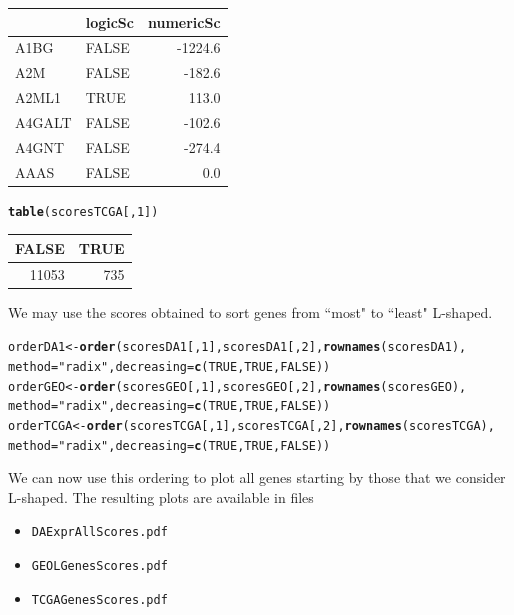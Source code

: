 \documentclass[a4paper,10pt]{article}\usepackage[]{graphicx}\usepackage[]{color}
\makeatletter
\newcommand{\hlnum}[1]{\textcolor[rgb]{0.686,0.059,0.569}{#1}}%
\newcommand{\hlstr}[1]{\textcolor[rgb]{0.192,0.494,0.8}{#1}}%
\newcommand{\hlstd}[1]{\textcolor[rgb]{0.345,0.345,0.345}{#1}}%
\newcommand{\hlkwb}[1]{\textcolor[rgb]{0.69,0.353,0.396}{#1}}%
\newcommand{\hlkwc}[1]{\textcolor[rgb]{0.333,0.667,0.333}{#1}}%
\newcommand{\hlkwd}[1]{\textcolor[rgb]{0.737,0.353,0.396}{\textbf{#1}}}%
\newenvironment{kframe}{%
 \def\at@end@of@kframe{}%
 \ifinner\ifhmode%
  \def\at@end@of@kframe{\end{minipage}}%
  \begin{minipage}{\columnwidth}%
 \fi\fi%
 \def\FrameCommand##1{\hskip\@totalleftmargin \hskip-\fboxsep
 \colorbox{shadecolor}{##1}\hskip-\fboxsep
     \hskip-\linewidth \hskip-\@totalleftmargin \hskip\columnwidth}%
 \MakeFramed {\advance\hsize-\width
   \@totalleftmargin\z@ \linewidth\hsize
   \@setminipage}}%
 {\par\unskip\endMakeFramed%
 \at@end@of@kframe}
\newenvironment{knitrout}{}{} %
\makeatother
\begin{document}
\begin{knitrout}
\begin{tabular}{l|l|r}
\hline
  & logicSc & numericSc\\
\hline
A1BG & FALSE & -1224.6\\
\hline
A2M & FALSE & -182.6\\
\hline
A2ML1 & TRUE & 113.0\\
\hline
A4GALT & FALSE & -102.6\\
\hline
A4GNT & FALSE & -274.4\\
\hline
AAAS & FALSE & 0.0\\
\hline
\end{tabular}\begin{kframe}\begin{alltt}
\hlkwd{table}\hlstd{(scoresTCGA[,}\hlnum{1}\hlstd{])}
\end{alltt}
\end{kframe}


\begin{tabular}{r|r}
\hline
FALSE & TRUE\\
\hline
11053 & 735\\
\hline
\end{tabular}
\end{knitrout}

We may use the scores obtained to sort genes from ``most" to ``least" L-shaped.

\begin{knitrout}
\color{fgcolor}\begin{kframe}
\begin{alltt}
\hlstd{orderDA1}\hlkwb{<-} \hlkwd{order}\hlstd{(scoresDA1[,}\hlnum{1}\hlstd{], scoresDA1[,}\hlnum{2}\hlstd{],} \hlkwd{rownames}\hlstd{(scoresDA1),}
                 \hlkwc{method}\hlstd{=}\hlstr{"radix"}\hlstd{,} \hlkwc{decreasing}\hlstd{=}\hlkwd{c}\hlstd{(}\hlnum{TRUE}\hlstd{,} \hlnum{TRUE}\hlstd{,} \hlnum{FALSE}\hlstd{))}
\hlstd{orderGEO}\hlkwb{<-} \hlkwd{order}\hlstd{(scoresGEO[,}\hlnum{1}\hlstd{], scoresGEO[,}\hlnum{2}\hlstd{],} \hlkwd{rownames}\hlstd{(scoresGEO),}
                 \hlkwc{method}\hlstd{=}\hlstr{"radix"}\hlstd{,} \hlkwc{decreasing}\hlstd{=}\hlkwd{c}\hlstd{(}\hlnum{TRUE}\hlstd{,} \hlnum{TRUE}\hlstd{,} \hlnum{FALSE}\hlstd{))}
\hlstd{orderTCGA}\hlkwb{<-} \hlkwd{order}\hlstd{(scoresTCGA[,}\hlnum{1}\hlstd{], scoresTCGA[,}\hlnum{2}\hlstd{],} \hlkwd{rownames}\hlstd{(scoresTCGA),}
                 \hlkwc{method}\hlstd{=}\hlstr{"radix"}\hlstd{,} \hlkwc{decreasing}\hlstd{=}\hlkwd{c}\hlstd{(}\hlnum{TRUE}\hlstd{,} \hlnum{TRUE}\hlstd{,} \hlnum{FALSE}\hlstd{))}
\end{alltt}
\end{kframe}
\end{knitrout}
We can now use this ordering to plot all genes starting by those that we consider L-shaped. The resulting plots are available in files 
\begin{itemize}
  \item \texttt{DAExprAllScores.pdf}
  \item \texttt{GEOLGenesScores.pdf}
  \item \texttt{TCGAGenesScores.pdf}
\end{itemize}
\end{document}
